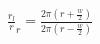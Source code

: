 \documentclass[preview]{standalone}
\begin{document}
\begin{center}
$\frac{r_{l}}r_{r} = \frac{2\pi(r+\frac{w}{2})}{2\pi(r-\frac{w}{2})}$
\end{center}
\end{document}
